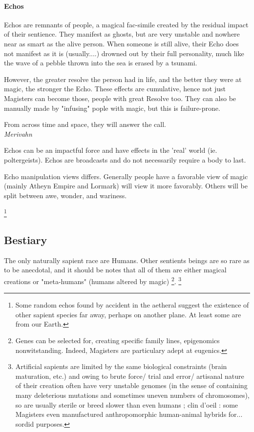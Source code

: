 \paragraph{Echos}

Echos are remnants of people, a magical fac-simile created by the residual impact of their sentience. They manifest as ghosts, but are very unstable and nowhere near as smart as the alive person. When someone is still alive, their Echo does not manifest as it is (usually....) drowned out by their full personality, much like the wave of a pebble thrown into the sea is erased by a tsunami. 

However, the greater resolve the person had in life, and the better they were at magic, the stronger the Echo. These effects are cumulative, hence not just Magisters can become those, people with great Resolve too. They can also be manually made by "infusing" pople with magic, but this is failure-prone.


\begin{rpg-quotebox}
    From across time and space, they will answer the call. \\ \textendash \textit{Merivahn}
\end{rpg-quotebox}
     
Echos can be an impactful force and have effects in the 'real' world (ie. poltergeists). Echos are broadcasts and do not necessarily require a body to last.
    
Echo manipulation views differs. Generally people have a favorable view of magic (mainly Atheyn Empire and Lormark) will view it more favorably. Others will be split between awe, wonder, and wariness.

\footnote{Some random echos found by accident in the aetheral suggest the existence of other sapient species far away, perhaps on another plane. At least some are from our Earth.}


\subsection{Bestiary}



The only naturally sapient race are Humans. Other sentients beings are so rare as to be anecdotal, and it should be notes that all of them are either magical creations or "meta-humans" (humans altered by magic)
\footnote{Genes can be selected for, creating specific family lines, epigenomics nonwitstanding. Indeed, Magisters are particulary adept at eugenics.}. \footnote{Artificial sapients are limited by the same biological constraints (brain maturation, etc.) and owing to brute force/ trial and error/ artisanal  nature of their creation often have very unstable genomes (in the sense of containing many deleterious mutations and sometimes uneven numbers of chromosomes), so are usually sterile or breed slower than even humans ; clin d'oeil : some Magisters even manufactured anthropomorphic human-animal hybrids for... sordid purposes.}

